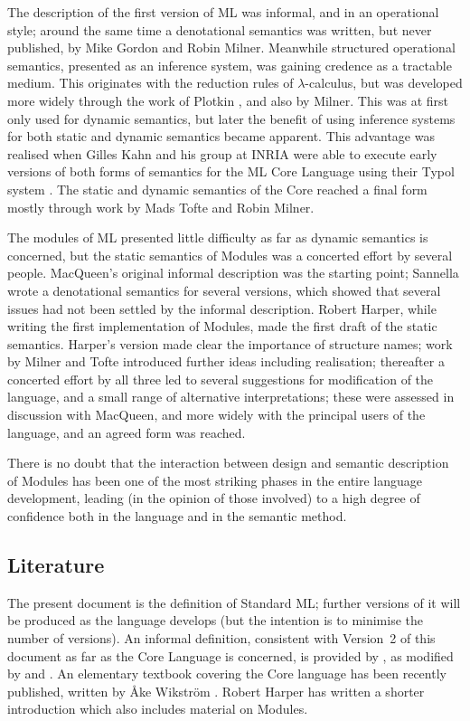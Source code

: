 The description of the first version of ML \cite{GMW} was informal, and in an 
operational style;  around the same time a denotational semantics was written,
but never published, by Mike Gordon and Robin Milner.  Meanwhile structured
operational semantics, presented as an inference system, was gaining
credence as a tractable medium.  This originates with the reduction rules
of $\lambda$-calculus, but was developed more widely through the work
of Plotkin \cite{Plo}, and also by Milner.   This was at
first only used for dynamic semantics, but later the
benefit of using inference systems for both static and dynamic
semantics became apparent.  This advantage was realised when Gilles Kahn
and his group at INRIA were able to execute early versions of both forms of 
semantics for the ML Core Language using their Typol system \cite{Des}.  
The static and dynamic
semantics of the Core reached a final form mostly through work by
Mads Tofte and Robin Milner.

The modules of ML presented little difficulty as far as dynamic semantics
is concerned, but the static semantics of Modules was a concerted effort
by several people.  MacQueen's original informal description \cite{HMM}
was the starting point;  Sannella wrote a denotational semantics for
several versions, which showed that several issues had not been settled
by the informal description.  Robert Harper, while writing the first
implementation of Modules, made the first draft of the static semantics.
Harper's version made clear the importance of structure names; 
work by Milner and Tofte introduced further ideas including realisation;
thereafter a concerted effort by all three led to several suggestions
for modification of the language, and a small range of alternative
interpretations;  these were assessed in discussion with MacQueen, and
more widely with the principal users of the language, and an agreed form
was reached.


There is no doubt that the interaction between design and semantic
description of  Modules has been one of the most striking phases in the
entire language development, leading (in the opinion of those involved)
to a high degree of confidence both in the language and in the semantic
method.

\subsection*{Literature} 
The present document is the definition of Standard ML; further versions
of it will be produced as the language develops (but the intention is
to minimise the number of versions).  An informal definition, consistent
with Version~2 of this document as far as the Core Language is concerned,
is provided by \cite{HMM}, as modified by \cite{Mil3} and \cite{AMMT}. An elementary
textbook covering the Core language has been recently published, 
written by {\AA}ke Wikstr\"{o}m \cite{Wik}.  
Robert Harper \cite{Har} has written a shorter
introduction which also includes material on Modules.


